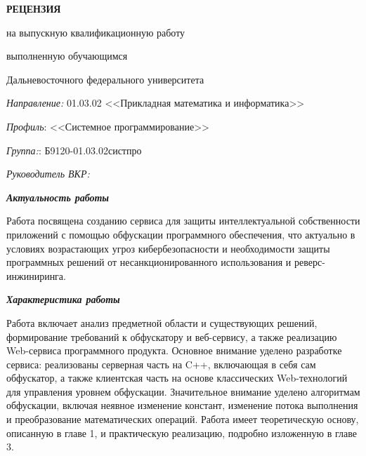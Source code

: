 \documentclass[12pt, a4paper, titlepage]{extarticle}
\begin{document}
	\drawtitle
	\pagestyle{empty}

	\vspace*{-10pt}

	\begin{center}

		\textbf{РЕЦЕНЗИЯ}

		\vspace*{-4pt}
		на выпускную квалификационную работу


		\vspace*{-4pt}
		выполненную обучающимся 

		\vspace*{-4pt}
		Дальневосточного федерального университета

		\vspace{5pt}

	\end{center}

	\noindent \textit{Направление:} 01.03.02 <<Прикладная математика и информатика>>

	\noindent \textit{Профиль}: <<Системное программирование>>

	\noindent \textit{Группа:}: Б9120-01.03.02систпро

	\noindent \textit{Руководитель ВКР:}  

	\textbf{\textit{Актуальность работы}}

		Работа посвящена созданию сервиса для защиты интеллектуальной собственности приложений с помощью обфускации программного обеспечения, что актуально в условиях возрастающих угроз кибербезопасности и необходимости защиты программных решений от несанкционированного использования и реверс-инжиниринга.

	\textbf{\textit{Характеристика работы}}

		Работа включает анализ предметной области и существующих решений, формирование требований к обфускатору и веб-сервису, а также реализацию Web-сервиса программного продукта. Основное внимание уделено разработке сервиса: реализованы серверная часть на C++, включающая в себя сам обфускатор, а также клиентская часть на основе классических Web-технологий для управления уровнем обфускации. Значительное внимание уделено алгоритмам обфускации, включая неявное изменение констант, изменение потока выполнения и преобразование математических операций. Работа имеет теоретическую основу, описанную в главе 1, и практическую реализацию, подробно изложенную в главе 3.
\end{document}
